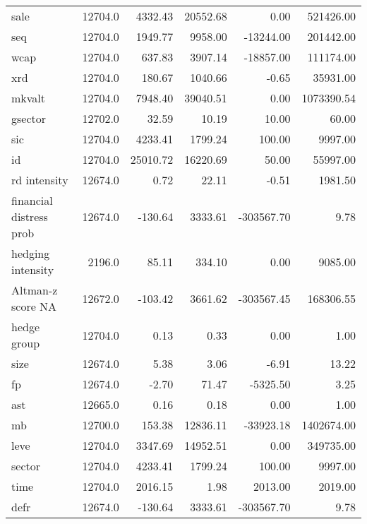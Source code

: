\begin{tabular}{lrrrrr}
sale                    &  12704.0 &   4332.43 &  20552.68 &       0.00 &   521426.00 \\
seq                     &  12704.0 &   1949.77 &   9958.00 &  -13244.00 &   201442.00 \\
wcap                    &  12704.0 &    637.83 &   3907.14 &  -18857.00 &   111174.00 \\
xrd                     &  12704.0 &    180.67 &   1040.66 &      -0.65 &    35931.00 \\
mkvalt                  &  12704.0 &   7948.40 &  39040.51 &       0.00 &  1073390.54 \\
gsector                 &  12702.0 &     32.59 &     10.19 &      10.00 &       60.00 \\
sic                     &  12704.0 &   4233.41 &   1799.24 &     100.00 &     9997.00 \\
id                      &  12704.0 &  25010.72 &  16220.69 &      50.00 &    55997.00 \\
rd intensity            &  12674.0 &      0.72 &     22.11 &      -0.51 &     1981.50 \\
financial distress prob &  12674.0 &   -130.64 &   3333.61 & -303567.70 &        9.78 \\
hedging intensity       &   2196.0 &     85.11 &    334.10 &       0.00 &     9085.00 \\
Altman-z score NA       &  12672.0 &   -103.42 &   3661.62 & -303567.45 &   168306.55 \\
hedge group             &  12704.0 &      0.13 &      0.33 &       0.00 &        1.00 \\
size                    &  12674.0 &      5.38 &      3.06 &      -6.91 &       13.22 \\
fp                      &  12674.0 &     -2.70 &     71.47 &   -5325.50 &        3.25 \\
ast                     &  12665.0 &      0.16 &      0.18 &       0.00 &        1.00 \\
mb                      &  12700.0 &    153.38 &  12836.11 &  -33923.18 &  1402674.00 \\
leve                    &  12704.0 &   3347.69 &  14952.51 &       0.00 &   349735.00 \\
sector                  &  12704.0 &   4233.41 &   1799.24 &     100.00 &     9997.00 \\
time                    &  12704.0 &   2016.15 &      1.98 &    2013.00 &     2019.00 \\
defr                    &  12674.0 &   -130.64 &   3333.61 & -303567.70 &        9.78 \\
\bottomrule
\end{tabular}
